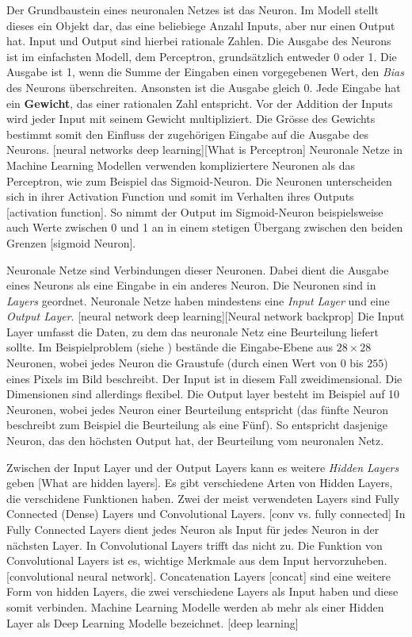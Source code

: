 Der Grundbaustein eines neuronalen Netzes ist das Neuron. Im Modell stellt
dieses ein Objekt dar, das eine beliebiege Anzahl Inputs, aber nur einen Output
hat. Input und Output sind hierbei rationale Zahlen. Die Ausgabe des Neurons ist
im einfachsten Modell, dem Perceptron, grundsätzlich entweder 0 oder 1. Die
Ausgabe ist 1, wenn die Summe der Eingaben einen vorgegebenen Wert, den
\emph{Bias} des Neurons überschreiten. Ansonsten ist die Ausgabe gleich 0. Jede
Eingabe hat ein \textbf{Gewicht}, das einer rationalen Zahl entspricht. Vor der
Addition der Inputs wird jeder Input mit seinem Gewicht multipliziert.  Die
Grösse des Gewichts bestimmt somit den Einfluss der zugehörigen Eingabe auf die
Ausgabe des Neurons. [neural networks deep learning][What is Perceptron]
Neuronale Netze in Machine Learning Modellen verwenden kompliziertere Neuronen
als das Perceptron, wie zum Beispiel das Sigmoid-Neuron. Die Neuronen
unterscheiden sich in ihrer Activation Function und somit im Verhalten ihres
Outputs [activation function]. So nimmt der Output im Sigmoid-Neuron beispielsweise auch Werte
zwischen 0 und 1 an in einem stetigen Übergang zwischen den beiden Grenzen [sigmoid Neuron].


Neuronale Netze sind Verbindungen dieser Neuronen. Dabei dient die Ausgabe eines
Neurons als eine Eingabe in ein anderes Neuron. Die Neuronen sind in
\emph{Layers} geordnet. Neuronale Netze haben mindestens eine \emph{Input Layer}
und eine \emph{Output Layer}. [neural network deep learning][Neural network backprop] Die Input Layer umfasst die Daten, zu dem das
neuronale Netz eine Beurteilung liefert sollte. Im Beispielproblem (siehe
) bestände die Eingabe-Ebene aus $28\times28$ Neuronen, wobei
jedes Neuron die Graustufe (durch einen Wert von 0 bis $255$) eines Pixels im
Bild beschreibt. Der Input ist in diesem Fall zweidimensional. Die Dimensionen
sind allerdings flexibel. Die Output layer besteht im Beispiel auf 10 Neuronen,
wobei jedes Neuron einer Beurteilung entspricht (das fünfte Neuron beschreibt
zum Beispiel die Beurteilung als eine Fünf). So entspricht dasjenige Neuron, das
den höchsten Output hat, der Beurteilung vom neuronalen Netz.

Zwischen der Input Layer und der Output Layers kann es weitere \emph{Hidden
Layers} geben [What are hidden layers]. Es gibt verschiedene Arten von Hidden
Layers, die verschidene Funktionen haben. Zwei der meist verwendeten Layers sind
Fully Connected (Dense) Layers und Convolutional Layers. [conv vs. fully connected] In Fully Connected
Layers dient jedes Neuron als Input für jedes Neuron in der nächsten Layer. In
Convolutional Layers trifft das nicht zu. Die Funktion von Convolutional Layers
ist es, wichtige Merkmale aus dem Input hervorzuheben. [convolutional neural network]. Concatenation Layers [concat] sind
eine weitere Form von hidden Layers, die zwei verschiedene Layers als Input
haben und diese somit verbinden. Machine Learning Modelle werden ab mehr als
einer Hidden Layer als Deep Learning Modelle bezeichnet. [deep learning]


